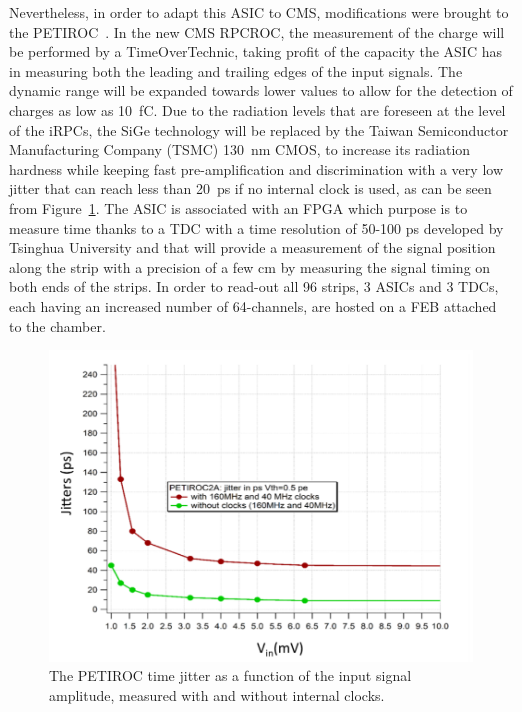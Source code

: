 	Nevertheless, in order to adapt this ASIC to CMS, modifications were brought to the PETIROC~\cite{PHASEIITP}. In the new CMS RPCROC, the measurement of the charge will be performed by a TimeOverTechnic, taking profit of the capacity the ASIC has in measuring both the leading and trailing edges of the input signals. The dynamic range will be expanded towards lower values to allow for the detection of charges as low as \SI{10}{fC}. Due to the radiation levels that are foreseen at the level of the iRPCs, the SiGe technology will be replaced by the Taiwan Semiconductor Manufacturing Company (TSMC) \SI{130}{nm} CMOS, to increase its radiation hardness while keeping fast pre-amplification and discrimination with a very low jitter that can reach less than \SI{20}{ps} if no internal clock is used, as can be seen from Figure~\ref{fig:jitter}. The ASIC is associated with an FPGA which purpose is to measure time thanks to a TDC with a time resolution of 50-100 \si{ps} developed by Tsinghua University and that will provide a measurement of the signal position along the strip with a precision of a few \si{cm} by measuring the signal timing on both ends of the strips. In order to read-out all 96 strips, 3 ASICs and 3 TDCs, each having an increased number of 64-channels, are hosted on a FEB attached to the chamber.

	\begin{figure}[H]
		\centering
		\includegraphics[width=0.8\plotwidth]{fig/chapt6/jitter-PETIROC.png}
		\caption{\label{fig:jitter} The PETIROC time jitter as a function of the input signal amplitude, measured with and without internal clocks.}
	\end{figure}

